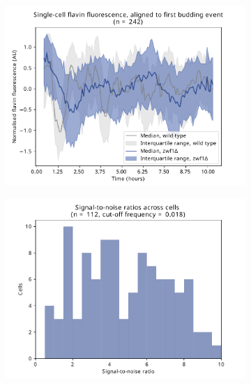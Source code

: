\begin{figure}
\begin{subfigure}[t]{0.45\textwidth}
   \caption{
   }
   \label{fig:biology-zwf1-acf}
  \end{subfigure}

  \begin{subfigure}[t]{0.45\textwidth}
   \centering
   \includegraphics[width=\textwidth]{zwf1egf_409_6.pdf}
   \caption{
   }
   \label{fig:biology-zwf1-median}
  \end{subfigure}%
  \begin{subfigure}[t]{0.45\textwidth}
   \centering
   \includegraphics[width=\textwidth]{zwf1egf_409_10.pdf}
   \caption{
   }
   \label{fig:biology-zwf1-snr}
  \end{subfigure}%


\end{figure}
